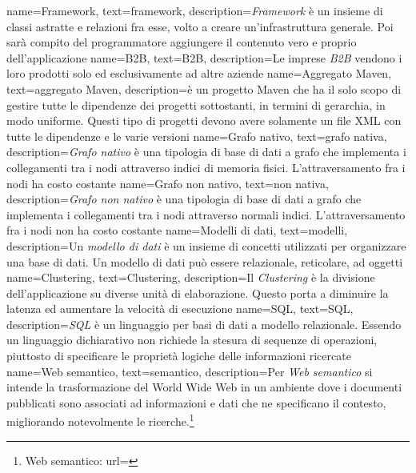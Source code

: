 
\renewcommand{\glossaryname}{Glossario}

{
    name=Framework,
    text=framework,
    description={\textit{Framework} è un insieme di classi astratte e relazioni fra esse, volto a creare un'infrastruttura generale. Poi sarà compito del programmatore aggiungere il contenuto vero e proprio dell'applicazione}
}
{
    name=B2B,
    text=B2B,
    description={Le imprese \textit{B2B} vendono i loro prodotti solo ed esclusivamente ad altre aziende}
}
{
    name=Aggregato Maven,
    text=aggregato Maven,
    description={è un progetto Maven che ha il solo scopo di gestire tutte le dipendenze dei progetti sottostanti, in termini di gerarchia, in modo uniforme. Questi tipo di progetti devono avere solamente un file XML con tutte le dipendenze e le varie versioni}
}
{
    name=Grafo nativo,
    text=grafo nativa,
    description={\textit{Grafo nativo} è una tipologia di base di dati a grafo che implementa i collegamenti tra i nodi attraverso indici di memoria fisici. L'attraversamento fra i nodi ha costo costante}
}
{
    name=Grafo non nativo,
    text=non nativa,
    description={\textit{Grafo non nativo} è una tipologia di base di dati a grafo che implementa i collegamenti tra i nodi attraverso normali indici. L'attraversamento fra i nodi non ha costo costante}
}
{
    name=Modelli di dati,
    text=modelli,
    description={Un \textit{modello di dati} è un insieme di concetti utilizzati per organizzare una base di dati. Un modello di dati può essere relazionale, reticolare, ad oggetti}
}
{
    name=Clustering,
    text=Clustering,
    description={Il \textit{Clustering} è la divisione dell'applicazione su diverse unità di elaborazione. Questo porta a diminuire la latenza ed aumentare la velocità di esecuzione}
}
{
    name=SQL,
    text=SQL,
    description={\textit{SQL} è un linguaggio per basi di dati a modello relazionale. Essendo un linguaggio dichiarativo non richiede la stesura di sequenze di operazioni, piuttosto di specificare le proprietà logiche delle informazioni ricercate}
}
{
    name=Web semantico,
    text=semantico,
    description={Per \textit{Web semantico} si intende la trasformazione del World Wide Web in un ambiente dove i documenti pubblicati sono associati ad informazioni e dati che ne specificano il contesto, migliorando notevolmente le ricerche.\footnote{Web semantico: url= }}
}
